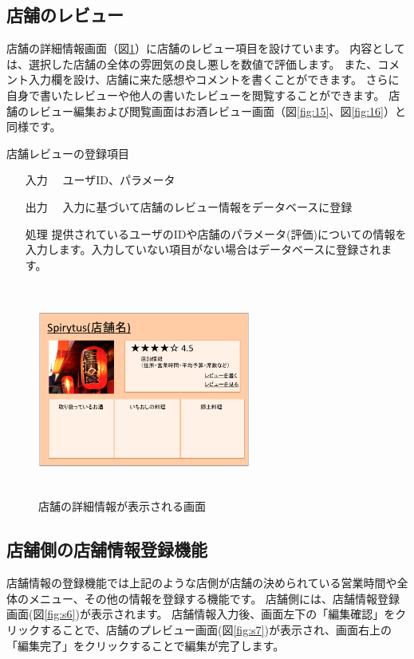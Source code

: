 \documentclass[a4j,titlepage]{jarticle}
\begin{document}
\subsection{店舗のレビュー}
店舗の詳細情報画面（図\ref{fig:17}）に店舗のレビュー項目を設けています。
内容としては、選択した店舗の全体の雰囲気の良し悪しを数値で評価します。
また、コメント入力欄を設け、店舗に来た感想やコメントを書くことができます。
さらに自身で書いたレビューや他人の書いたレビューを閲覧することができます。
店舗のレビュー編集および閲覧画面はお酒レビュー画面（図\ref{fig:15}、図\ref{fig:16}）と同様です。


店舗レビューの登録項目
\begin{enumerate}
  \item [入力]　ユーザID、パラメータ
  \item [出力]　入力に基づいて店舗のレビュー情報をデータベースに登録
  \item [処理]  提供されているユーザのIDや店舗のパラメータ(評価)についての情報を入力します。入力していない項目がない場合はデータベースに登録されます。
\end{enumerate}

\begin {figure}[htbp]
    \begin{center}
    \includegraphics [height=7cm, width=7cm]{extrnal_design_document_image/17.eps}
    \caption {店舗の詳細情報が表示される画面}
    \label {fig:17}
    \end{center}
\end {figure}

\subsection{店舗側の店舗情報登録機能}
店舗情報の登録機能では上記のような店側が店舗の決められている営業時間や全体のメニュー、その他の情報を登録する機能です。
店舗側には、店舗情報登録画面(図\ref{fig:s6})が表示されます。
店舗情報入力後、画面左下の「編集確認」をクリックすることで、店舗のプレビュー画面(図\ref{fig:s7})が表示され、画面右上の「編集完了」をクリックすることで編集が完了します。
\end{document}
